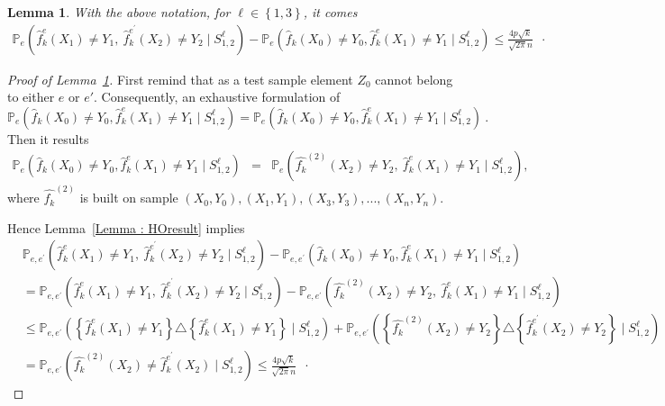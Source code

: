 \documentclass[twoside,11pt]{article}
\numberwithin{equation}{section}
\newtheorem{lem}{Lemma}[section]
\newcommand{\f}[1]{ \widehat{f}_k( #1 ) }
\newcommand{\fe}[1]{ \widehat{f}_k^e(#1 ) }
\newcommand{\fep}[1]{ \widehat{f}_k^{e^\prime}(#1 ) }
\newcommand{\1}{\mathds{1}}%
\newcommand{\paren}[1]{\left( #1 \right)}
\newcommand{\acc}[1]{\left\{ #1 \right\}}
\renewcommand{\P}{\mathbb{P}}
\numberwithin{equation}{section}
\theoremstyle{plain}
\begin{document}
\medskip

\begin{lem}\label{lem.2.notin.e}
With the above notation, for $\ell \in \acc{1,3}$, it comes
{\small
\begin{align*}
	\P_e\paren{\fe{X_1}\neq Y_1,\ \fep{X_2}\neq Y_2 \mid S^{\ell}_{1,2}} - \P_e\paren{\f{X_0}\neq Y_0,\fe{X_{1}}\neq Y_{1} \mid S^{\ell}_{1,2}} \leq \frac{4p\sqrt{k}}{\sqrt{2\pi}n} \enspace\cdot
\end{align*}}

\end{lem}

\begin{proof}[Proof of Lemma~\ref{lem.2.notin.e}]
First remind that as a test sample element $Z_0$ cannot belong to either $e$ or $e'$. Consequently, an exhaustive formulation of
$$\P_e\paren{\f{X_0}\neq Y_0,\fe{X_{1}}\neq Y_{1} \mid S^{\ell}_{1,2}} = \P_e\paren{\f{X_0}\neq Y_0,\fe{X_{1}}\neq Y_{1} \mid S^{\ell}_{1,2} } \ .$$
Then it results
\begin{eqnarray*}
\P_e\paren{\f{X_0}\neq Y_0,\fe{X_{1}}\neq Y_{1} \mid S^{\ell}_{1,2}}
&=&\P_e\paren{\widehat{f_k}^{(2)}(X_2)\neq Y_2,\ \fe{X_1}\neq Y_1 \mid S^{\ell}_{1,2}},
\end{eqnarray*}
where $\widehat{f_k}^{(2)}$ is built on sample $(X_0,Y_0),(X_1,Y_1),(X_3,Y_3),...,(X_n,Y_n)$.


Hence Lemma~\ref{Lemma : HOresult} implies
\begin{align*}
&\P_{e,e^\prime} \paren{\fe{X_1}\neq Y_1,\ \fep{X_2}\neq Y_2 \mid S^{\ell}_{1,2}} - \P_{e,e^\prime} \paren{\f{X_0}\neq Y_0,\fe{X_{1}}\neq Y_{1} \mid S^{\ell}_{1,2}} \\
%
&= \P_{e,e^\prime} \paren{\fe{X_1}\neq Y_1,\ \fep{X_2}\neq Y_2 \mid S^{\ell}_{1,2}} -\P_{e,e^\prime} \paren{\widehat{f_k}^{(2)}(X_2)\neq Y_2,\ \fe{X_1}\neq Y_1 \mid S^{\ell}_{1,2} }\\
%
& \leq \P_{e,e^\prime} \paren{\left\{\fe{X_1}\neq Y_1 \right\}\triangle \left\{\fe{X_1}\neq Y_1\right\} \mid S^{\ell}_{1,2} }+ \P_{e,e^\prime} \paren{\left\{\widehat{f_k}^{(2)}(X_2)\neq Y_2 \right\} \triangle \left\{ \fep{X_2}\neq Y_2\right\}\mid S^{\ell}_{1,2} }\\
%
&= \P_{e,e^\prime} \paren{\widehat{f_k}^{(2)}(X_2)\neq \fep{X_2}\mid S^{\ell}_{1,2}} \leq  \frac{4p\sqrt{k}}{\sqrt{2\pi} n} \enspace\cdot
\end{align*}

\end{proof}

\medskip
\end{document}
